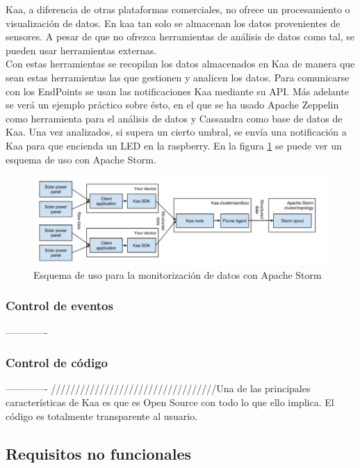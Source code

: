 \documentclass[12pt, twoside]{book}
\begin{document}
Kaa, a diferencia de otras plataformas comerciales, no ofrece un procesamiento o visualización de datos. En kaa tan solo se almacenan los datos provenientes de sensores. A pesar de que no ofrezca herramientas de análisis de datos como tal, se pueden usar herramientas externas. \\
Con estas herramientas se recopilan los datos almacenados en Kaa de manera que sean estas herramientas las que gestionen y analicen los datos. Para comunicarse con los EndPoints se usan las notificaciones Kaa mediante su API.
Más adelante se verá un ejemplo práctico sobre ésto, en el que se ha usado Apache Zeppelin como herramienta para el análisis de datos y Cassandra como base de datos de Kaa. Una vez analizados, si supera un cierto umbral, se envía una notificación a Kaa para que encienda un LED en la raspberry.
En la figura \ref{L507} se puede ver un esquema de uso con Apache Storm.
\begin{figure}[H]
\centering
\includegraphics[scale=0.6]{images/esquema_apache}
\caption{Esquema de uso para la monitorización de datos con Apache Storm}\label{L507}
\end{figure} 
\subsubsection*{Control de eventos}
-------------
\subsubsection*{Control de código}
-------------
//////////////////////////////////Una de las principales características de Kaa es que es Open Source con todo lo que ello implica. El código es totalmente transparente al usuario.
\subsection{Requisitos no funcionales}
\end{document}
